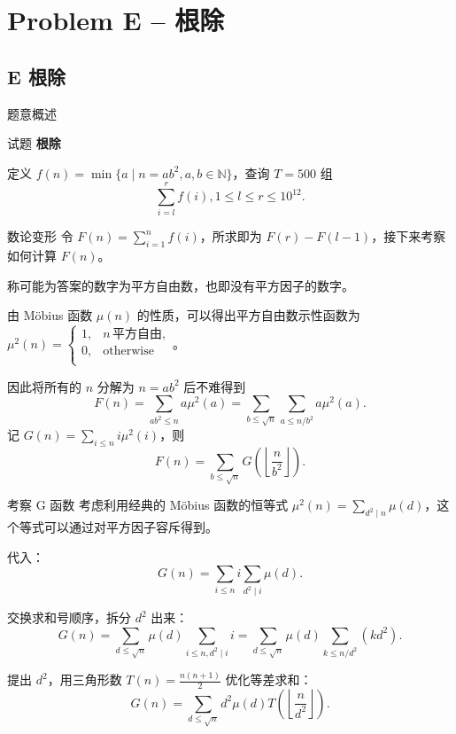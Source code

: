 \documentclass{beamer}
\newcommand{\TT}[1]{{\ttfamily #1}}
\newcommand{\BF}[1]{\textbf{#1}}
\begin{document}
{
\section[E]{Problem E -- 根除}
\subsection{E 根除}
\begin{frame}{题意概述}
  \begin{center}试题 \myboxv{\BF{\TT{E}}} \BF{根除}\end{center}
  定义 $f(n) = \min\{a \mid n = ab^2, a, b \in \mathbb{N}\}$，查询 $T = 500$ 组
  \[
    \sum_{i=l}^{r}f(i), 1 \le l \le r \le 10^{12}.
  \]
\end{frame}


\begin{frame}{数论变形}
  令 $F(n)=\sum_{i=1}^{n}f(i)$，所求即为 $F(r) - F(l - 1)$，接下来考察如何计算 $F(n)$。

  称可能为答案的数字为平方自由数，也即没有平方因子的数字。

  由 Möbius 函数 $\mu(n)$ 的性质，可以得出平方自由数示性函数为 $\mu^2(n) = \begin{cases}
    1, &n\,\text{平方自由},\\
    0, &\text{otherwise}\\
  \end{cases}$。

  因此将所有的 $n$ 分解为 $n = ab^2$ 后不难得到
  \[
    F(n) = \sum_{ab^2\le n} a\mu^2(a) = \sum_{b\le\sqrt n}\sum_{a\le n/b^2}a\mu^2(a).
  \]
  记 $G(n) = \sum\limits_{i\le n}i\mu^2(i)$，则 \[F(n) = \sum_{b\le\sqrt n}G\left(\left\lfloor\frac n{b^2}\right\rfloor\right).\]
\end{frame}

\begin{frame}{考察 G 函数}
  考虑利用经典的 Möbius 函数的恒等式 $\mu^2(n)=\sum\limits_{d^2\mid n}\mu(d)$，这个等式可以通过对平方因子容斥得到。

代入：
\[
G(n) =\sum_{i\le n} i \sum_{d^2\mid i}\mu(d).
\]

交换求和号顺序，拆分 $d^2$ 出来：
\[
G(n)=\sum_{d\le \sqrt{n}}\mu(d)\sum_{i\le n, d^2\mid i}i
= \sum_{d\le\sqrt n}\mu(d)\sum_{k\le n/d^2} (kd^2).
\]

提出 $d^2$，用三角形数 $T(n) = \frac{n(n + 1)}{2}$ 优化等差求和：
\[
  G(n) = \sum_{d\le\sqrt n}d^2\mu(d)T\left(\left\lfloor\frac n{d^2}\right\rfloor\right).
\]


\end{frame}}
\end{document}

